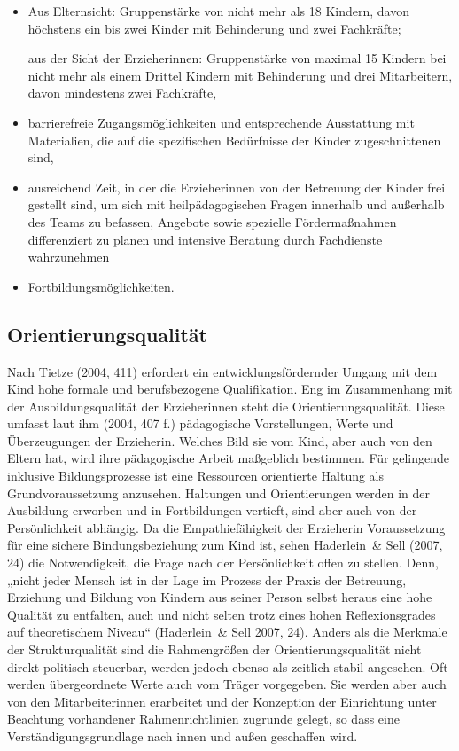 \begin{itemize}
\item Aus Elternsicht: Gruppenstärke von nicht mehr als 18 Kindern, davon höchstens ein bis zwei Kinder mit Behinderung und zwei Fachkräfte; 

aus der Sicht der Erzieherinnen: Gruppenstärke von maximal 15 Kindern bei nicht mehr als einem Drittel Kindern mit Behinderung und drei Mitarbeitern, davon mindestens zwei Fachkräfte,
\item barrierefreie Zugangsmöglichkeiten und entsprechende Ausstattung mit Materialien, die auf die spezifischen Bedürfnisse der Kinder zugeschnittenen sind, 
\item ausreichend Zeit, in der die Erzieherinnen von der Betreuung der Kinder frei gestellt sind, um sich mit heilpädagogischen Fragen innerhalb und außerhalb des Teams zu befassen, Angebote sowie spezielle Fördermaßnahmen differenziert zu planen und intensive Beratung durch Fachdienste wahrzunehmen
\item Fortbildungsmöglichkeiten.
\end{itemize}

\subsection{Orientierungsqualität}
Nach Tietze (2004, 411) erfordert ein entwicklungsfördernder Umgang mit dem Kind hohe formale und berufsbezogene Qualifikation. Eng im Zusammenhang mit der Ausbildungsqualität der Erzieherinnen steht die Orientierungsqualität. Diese umfasst laut ihm (2004, 407 f.) pädagogische Vorstellungen, Werte und Überzeugungen der Erzieherin. Welches Bild sie vom Kind, aber auch von den Eltern hat, wird ihre pädagogische Arbeit maßgeblich bestimmen. Für gelingende inklusive Bildungsprozesse ist eine Ressourcen orientierte Haltung als Grundvoraussetzung anzusehen. Haltungen und Orientierungen werden in der Ausbildung erworben und in Fortbildungen vertieft, sind aber auch von der Persönlichkeit abhängig. 
Da die Empathiefähigkeit der Erzieherin Voraussetzung für eine sichere Bindungsbeziehung zum Kind ist, sehen Haderlein~\& Sell (2007, 24) die Notwendigkeit, die Frage nach der Persönlichkeit offen zu stellen. Denn, „nicht jeder Mensch ist in der Lage im Prozess der Praxis der Betreuung, Erziehung und Bildung von Kindern aus seiner Person selbst heraus eine hohe Qualität zu entfalten, auch und nicht selten trotz eines hohen Reflexionsgrades auf theoretischem Niveau“ (Haderlein~\& Sell 2007, 24). Anders als die Merkmale der Strukturqualität sind die Rahmengrößen der Orientierungsqualität nicht direkt politisch steuerbar, werden jedoch ebenso als zeitlich stabil angesehen. Oft werden übergeordnete Werte auch vom Träger vorgegeben. Sie werden aber auch von den Mitarbeiterinnen erarbeitet und der Konzeption der Einrichtung unter Beachtung vorhandener Rahmenrichtlinien zugrunde gelegt, so dass eine Verständigungsgrundlage nach innen und außen geschaffen wird. 

